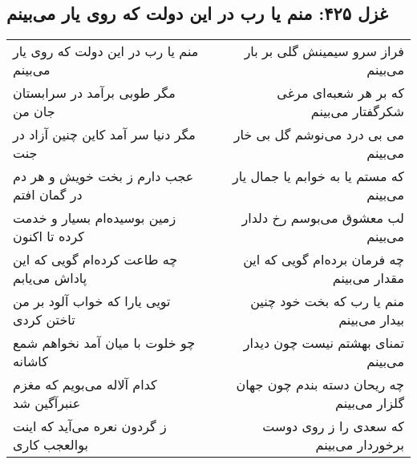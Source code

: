 \begin{center}
\section*{غزل ۴۲۵: منم یا رب در این دولت که روی یار می‌بینم}
\label{sec:425}
\begin{longtable}{l p{0.5cm} r}
منم یا رب در این دولت که روی یار می‌بینم
&&
فراز سرو سیمینش گلی بر بار می‌بینم
\\
مگر طوبی برآمد در سرابستان جان من
&&
که بر هر شعبه‌ای مرغی شکرگفتار می‌بینم
\\
مگر دنیا سر آمد کاین چنین آزاد در جنت
&&
می بی درد می‌نوشم گل بی خار می‌بینم
\\
عجب دارم ز بخت خویش و هر دم در گمان افتم
&&
که مستم یا به خوابم یا جمال یار می‌بینم
\\
زمین بوسیده‌ام بسیار و خدمت کرده تا اکنون
&&
لب معشوق می‌بوسم رخ دلدار می‌بینم
\\
چه طاعت کرده‌ام گویی که این پاداش می‌یابم
&&
چه فرمان برده‌ام گویی که این مقدار می‌بینم
\\
تویی یارا که خواب آلود بر من تاختن کردی
&&
منم یا رب که بخت خود چنین بیدار می‌بینم
\\
چو خلوت با میان آمد نخواهم شمع کاشانه
&&
تمنای بهشتم نیست چون دیدار می‌بینم
\\
کدام آلاله می‌بویم که مغزم عنبرآگین شد
&&
چه ریحان دسته بندم چون جهان گلزار می‌بینم
\\
ز گردون نعره می‌آید که اینت بوالعجب کاری
&&
که سعدی را ز روی دوست برخوردار می‌بینم
\\
\end{longtable}
\end{center}
